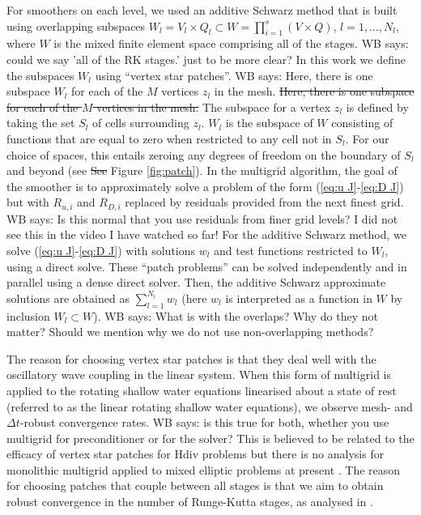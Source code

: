 \documentclass[a4paper, 12pt]{article}
\newcommand{\checkit}[1]{{\color{red}#1}}
\newcommand{\werner}[1]{{\color{magenta}WB says: #1}}
\begin{document}
For smoothers on each level, we used an additive Schwarz method that
is built using overlapping subspaces $W_l=V_l\times Q_l \subset W =
\prod_{i=1}^s\left(V \times Q\right)$, $l=1,\ldots,N_l$, where $W$ is
the mixed finite element space comprising all of the stages.
\werner{could we say 'all of the RK stages.' just to be more clear?}
In this work we define the subspaces $W_l$ using ``vertex
star patches''.
\werner{Here, there is one subspace $W_l$ for each of the $M$
vertices $z_l$ in the mesh.}
\st{Here, there is one subspace for each of the $M$
vertices in the mesh.}
The subspace for a vertex $z_l$ is defined by
taking the set $S_l$ of cells surrounding $z_l$. $W_l$ is the subspace
of $W$ consisting of functions that are equal to zero when restricted
to any cell not in $S_l$. For our choice of spaces, this entails
zeroing any degrees of freedom on the boundary of $S_l$ and beyond
(\checkit{see} \st{See} Figure \ref{fig:patch}). In the multigrid algorithm, the goal of
the smoother is to approximately solve a problem of the form
(\ref{eq:u J}-\ref{eq:D J}) but with $R_{u,i}$ and $R_{D,i}$ replaced
by residuals provided from the next finest grid.
\werner{Is this normal that you use residuals from finer grid levels? I did not see this in the video I have watched so far!}
For the additive
Schwarz method, we solve (\ref{eq:u J}-\ref{eq:D J}) with solutions
$w_l$ and test functions restricted to $W_l$, using a direct
solve. These ``patch problems'' can be solved independently and in
parallel using a dense direct solver.  Then, the additive Schwarz
approximate solutions are obtained as $\sum_{l=1}^{N_l}w_l$ (here
$w_l$ is interpreted as a function in $W$ by inclusion $W_l\subset
W$).
\werner{What is with the overlaps? Why do they not matter?
Should we mention why we do not use non-overlapping methods?
}

The reason for choosing vertex star patches is that they deal well
with the oscillatory wave coupling in the linear system. When this
form of multigrid is applied to the rotating shallow water equations
linearised about a state of rest (referred to as the linear rotating
shallow water equations), we observe mesh- and $\Delta t$-robust
convergence rates.
\werner{is this true for both, whether you use multigrid for preconditioner or for the solver?}
This is believed to be related to the efficacy of
vertex star patches for Hdiv problems \citep{arnold2000multigrid} but
there is no analysis for monolithic multigrid applied to mixed
elliptic problems at present \citep{sm}. The reason for choosing patches
that couple between all stages is that we aim to obtain robust
convergence in the number of Runge-Kutta stages, as analysed in
\citep{kirby2024convergence}.
\end{document}
